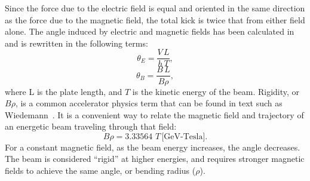 Since the force due to the electric field is equal and oriented in the same direction as the force due to the magnetic field, 
the total kick is twice that from either field alone.  
The angle induced by electric and magnetic fields has been calculated in~\cite{iukicker, Wiedemann}
and is rewritten in the following terms:  
\begin{equation}
\theta_E= \frac{V\,L}{h\,T},
\end{equation}
\begin{equation}
\theta_B= \frac{B\,L}{B\rho},
\end{equation}
where L is the plate length, and $T$ is the kinetic energy of the beam. 
Rigidity, or $B\rho$, is a common accelerator physics term that can be found in text such as Wiedemann~\cite{Wiedemann}. 
It is a convenient way to relate the magnetic field and trajectory of an energetic beam traveling through that field:
\begin{equation}
	B\rho=3.33564\,\,T\, \text{[GeV-Tesla]}.
\end{equation} 
For a constant magnetic field, as the beam energy increases, the angle decreases. 
The beam is considered ``rigid'' at higher energies, 
and requires stronger magnetic fields to achieve the same angle, or bending radius ($\rho$).

